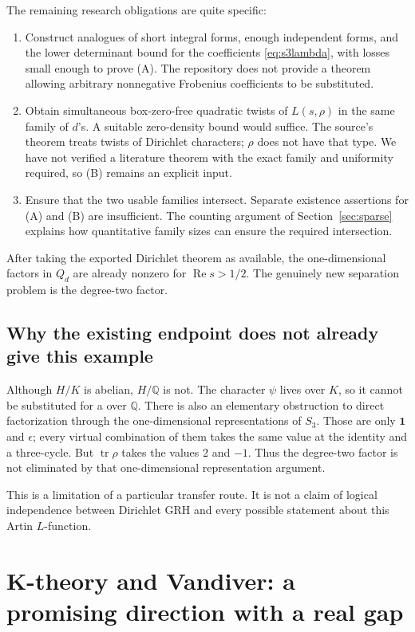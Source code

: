 \documentclass[11pt,letterpaper]{article}
\theoremstyle{definition}
\theoremstyle{remark}
\newcommand{\Q}{\mathbb Q}
\newcommand{\Rea}{\operatorname{Re}}
\newcommand{\tr}{\operatorname{tr}}
\newcommand{\code}[1]{\texttt{\small\detokenize{#1}}}
\begin{document}
The remaining research obligations are quite specific:
\begin{enumerate}
\item Construct analogues of short integral forms, enough independent
forms, and the lower determinant bound for the coefficients
\eqref{eq:s3lambda}, with losses small enough to prove (A).
The repository does not provide a theorem allowing arbitrary
nonnegative Frobenius coefficients to be substituted.
\item Obtain simultaneous box-zero-free quadratic twists of
\(L(s,\rho)\) in the same family of \(d\)'s. A suitable
zero-density bound would suffice. The source's theorem treats
twists of Dirichlet characters; \(\rho\) does not have that type.
We have not verified a literature theorem with the exact family
and uniformity required, so (B) remains an explicit input.
\item Ensure that the two usable families intersect. Separate
existence assertions for (A) and (B) are insufficient.
The counting argument of Section~\ref{sec:sparse} explains how
quantitative family sizes can ensure the required intersection.
\end{enumerate}

After taking the exported Dirichlet theorem as available, the
one-dimensional factors in \(Q_d\) are already nonzero for
\(\Rea s>1/2\). The genuinely new separation problem is the
degree-two factor.

\subsection{Why the existing endpoint does not already give this example}

Although \(H/K\) is abelian, \(H/\Q\) is not.
The character \(\psi\) lives over \(K\), so it cannot be substituted
for a \code{DirichletCharacter} over \(\Q\).
There is also an elementary obstruction to direct factorization
through the one-dimensional representations of \(S_3\).
Those are only \(\mathbf1\) and \(\epsilon\); every virtual
combination of them takes the same value at the identity and
a three-cycle. But \(\tr\rho\) takes the values 2 and \(-1\).
Thus the degree-two factor is not eliminated by that
one-dimensional representation argument.

This is a limitation of a particular transfer route. It is not
a claim of logical independence between Dirichlet GRH and every
possible statement about this Artin \(L\)-function.

\section{K-theory and Vandiver: a promising direction with a real gap}
\label{sec:ktheory}
\end{document}
